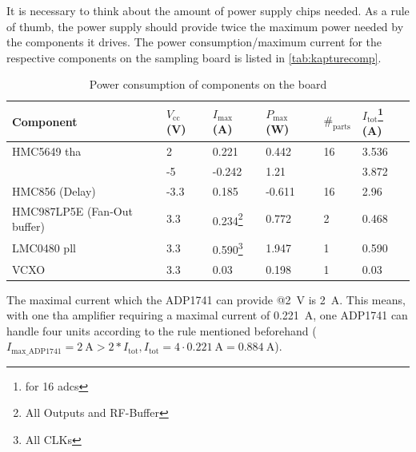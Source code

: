 It is necessary to think about the amount of power supply chips needed. As a rule of thumb, the power supply should provide twice the maximum power needed by the components it drives. \cite{michele} The power consumption/maximum current for the respective components on the sampling board is listed in \autoref{tab:kapturecomp}. 
\begin{table}[tbh]
	\caption{Power consumption of components on the board}
	\label{tab:kapturecomp}
	\begin{minipage}{\textwidth}
		\centering
		\begin{tabularx}{\textwidth}{Xlllll}
			\toprule
			\textbf{Component}          & $V_\text{cc}$ (V) & $I_\text{max}$ (A)                        & $P_\text{max}$ (W) & $\#_\text{parts}$ & $I_\text{tot}$\footnote{for 16 \glspl{adc}} (A) \\ \midrule
			HMC5649 \gls{tha}           & 2                 & 0.221                                     & 0.442              & 16                & 3.536                                           \\
			                            & -5                & -0.242                                    & 1.21               &                   & 3.872                                           \\
			HMC856 (Delay)              & -3.3              & 0.185                                     & -0.611             & 16                & 2.96                                            \\
			HMC987LP5E (Fan-Out buffer) & 3.3               & 0.234\footnote{All Outputs and RF-Buffer} & 0.772              & 2                 & 0.468                                           \\
			LMC0480 \gls{pll}           & 3.3               & 0.590\footnote{All CLKs}                  & 1.947              & 1                 & 0.590                                           \\
			VCXO                        & 3.3               & 0.03                                      & 0.198              & 1                 & 0.03                                            \\ \bottomrule
		\end{tabularx}
	\end{minipage}
\end{table}

The maximal current which the ADP1741 can provide @\SI{2}{\volt} is \SI{2}{\ampere}.
This means, with one \gls{tha} amplifier requiring a maximal current of \SI{0.221}{\ampere}, one ADP1741 can handle four units according to the rule mentioned beforehand ($I_{\text{max\_ADP1741}} = \SI{2}{\ampere} > 2 * I_\text{tot}, I_\text{tot} = 4 \cdot \SI{0.221}{\ampere} =  \SI{0.884}{\ampere}$).


